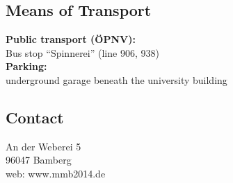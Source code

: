 \subsection{\textcolor{unibablueI}{Means of Transport}}
\textbf{\textcolor{unibablueII}{Public transport (ÖPNV):}}\\
Bus stop ``Spinnerei'' (line 906, 938)\\
\textbf{\textcolor{unibablueII}{Parking:}}\\
underground garage beneath the university building

\subsection{\textcolor{unibablueI}{Contact}}
An der Weberei 5\\
96047 Bamberg\\[2ex]
web: www.mmb2014.de